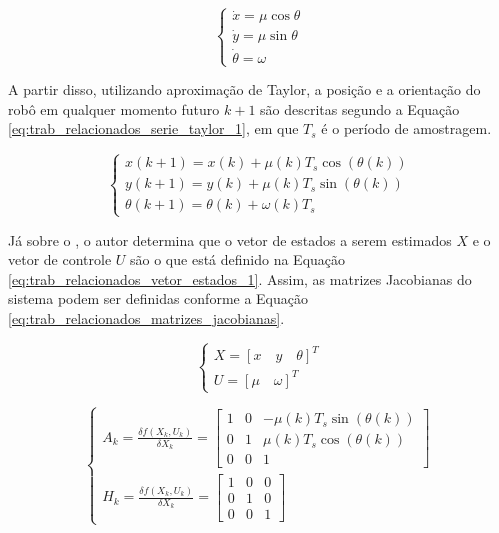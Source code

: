 \documentclass[acronym, symbols, table]{fei}
\begin{document}
\begin{equation}\label{eq:trab_relacionados_cinematica_1}
	\begin{cases}
		\dot{x} = \mu \cos{\theta} \\
		\dot{y} = \mu \sin{\theta} \\
		\dot{\theta} = \omega
	\end{cases}
\end{equation}

A partir disso, utilizando aproximação de Taylor, a posição e a orientação do robô em qualquer momento futuro $k + 1$ são descritas segundo a Equação \eqref{eq:trab_relacionados_serie_taylor_1}, em que $T_s$ é o período de amostragem.

\begin{equation} \label{eq:trab_relacionados_serie_taylor_1}
	\begin{cases*}
		x(k+1) = x(k) + \mu(k)T_s\cos{(\theta(k))} \\
		y(k+1) = y(k) + \mu(k)T_s\sin{(\theta(k))} \\
		\theta(k+1) = \theta(k) + \omega(k)T_s
	\end{cases*}
\end{equation}

Já sobre o , o autor determina que o vetor de estados a serem estimados $X$ e o vetor de controle $U$ são o que está definido na Equação \eqref{eq:trab_relacionados_vetor_estados_1}. Assim, as matrizes Jacobianas do sistema podem ser definidas conforme a Equação \eqref{eq:trab_relacionados_matrizes_jacobianas}.

\begin{equation}\label{eq:trab_relacionados_vetor_estados_1}
	\begin{cases}
		X = [x \quad y \quad \theta]^T \\
		U = [\mu \quad \omega]^T
	\end{cases}
\end{equation}

\begin{equation}\label{eq:trab_relacionados_matrizes_jacobianas}
	\begin{cases}
		A_k = \frac{\delta f(X_k, U_k)}{\delta X_k} = \begin{bmatrix}
			1 & 0 & -\mu(k)T_s\sin{(\theta(k))} \\
			0 & 1 & \mu(k)T_s\cos{(\theta(k))}  \\
			0 & 0 & 1
		\end{bmatrix} \\[30pt]
		
		H_k = \frac{\delta f(X_k, U_k)}{\delta X_k} = 
		\begin{bmatrix}
			1 & 0 & 0 \\
			0 & 1 & 0 \\
			0 & 0 & 1 
		\end{bmatrix}		
	\end{cases}
\end{equation}
\end{document}
